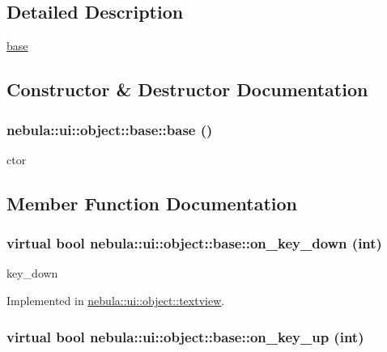 \subsection{Detailed Description}
\hyperlink{classnebula_1_1ui_1_1object_1_1base}{base} 

\subsection{Constructor \& Destructor Documentation}
\hypertarget{classnebula_1_1ui_1_1object_1_1base_abf16edd95689e30415423c775bc86724}{
\subsubsection[{base}]{\setlength{\rightskip}{0pt plus 5cm}nebula::ui::object::base::base ()}}
\label{classnebula_1_1ui_1_1object_1_1base_abf16edd95689e30415423c775bc86724}
ctor 

\subsection{Member Function Documentation}
\hypertarget{classnebula_1_1ui_1_1object_1_1base_a239afd11ea6371cdf4551a4e3c99a84c}{
\subsubsection[{on\_\-key\_\-down}]{\setlength{\rightskip}{0pt plus 5cm}virtual bool nebula::ui::object::base::on\_\-key\_\-down (int)}}
\label{classnebula_1_1ui_1_1object_1_1base_a239afd11ea6371cdf4551a4e3c99a84c}


key\_\-down 

Implemented in \hyperlink{classnebula_1_1ui_1_1object_1_1textview_a94196ab110d65359fe5721324f0f454d}{nebula::ui::object::textview}.\hypertarget{classnebula_1_1ui_1_1object_1_1base_aa65861b29412bd80cb57a6cad8c12141}{
\subsubsection[{on\_\-key\_\-up}]{\setlength{\rightskip}{0pt plus 5cm}virtual bool nebula::ui::object::base::on\_\-key\_\-up (int)}}
\label{classnebula_1_1ui_1_1object_1_1base_aa65861b29412bd80cb57a6cad8c12141}


